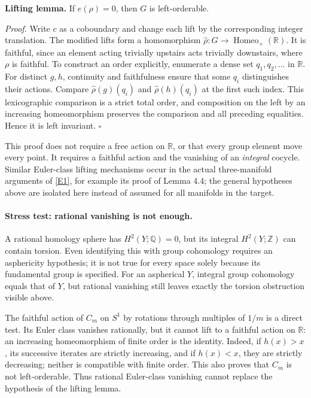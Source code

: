 \documentclass[11pt,a4paper]{article}
\newcommand{\Z}{\mathbb{Z}}
\newcommand{\Q}{\mathbb{Q}}
\newcommand{\R}{\mathbb{R}}
\newcommand{\eref}[2]{\hyperlink{extra:#1:#2}{[E#2]}}
\numberwithin{equation}{section}
\begin{document}
\textbf{Lifting lemma.} If $e(\rho)=0$, then $G$ is left-orderable.

\textit{Proof.} Write $c$ as a coboundary and change each lift by the
corresponding integer translation. The modified lifts form a homomorphism
$\widehat\rho:G\to\operatorname{Homeo}_+(\R)$. It is faithful, since an
element acting trivially upstairs acts trivially downstairs, where $\rho$
is faithful. To construct an order explicitly, enumerate a dense set
$q_1,q_2,\ldots$ in $\R$. For distinct $g,h$, continuity and faithfulness
ensure that some $q_i$ distinguishes their actions. Compare
$\widehat\rho(g)(q_i)$ and $\widehat\rho(h)(q_i)$ at the first such index.
This lexicographic comparison is a strict total order, and composition on
the left by an increasing homeomorphism preserves the comparison and all
preceding equalities. Hence it is left invariant. \hfill$\square$

This proof does not require a free action on $\R$, or that every group
element move every point. It requires a faithful action and the vanishing
of an \emph{integral} cocycle. Similar Euler-class lifting mechanisms
occur in the actual three-manifold arguments of \eref{statement}{1}, for example
its proof of Lemma 4.4; the general hypotheses above are isolated here
instead of assumed for all manifolds in the target.

\paragraph{Stress test: rational vanishing is not enough.}
A rational homology sphere has $H^2(Y;\Q)=0$, but its integral
$H^2(Y;\Z)$ can contain torsion. Even identifying this with group
cohomology requires an asphericity hypothesis; it is not true for every
space solely because its fundamental group is specified. For an
aspherical $Y$, integral group cohomology equals that of $Y$, but rational
vanishing still leaves exactly the torsion obstruction visible above.

The faithful action of $C_m$ on $S^1$ by rotations through multiples of
$1/m$ is a direct test. Its Euler class vanishes rationally, but it cannot
lift to a faithful action on $\R$: an increasing homeomorphism of finite
order is the identity. Indeed, if $h(x)>x$, its successive iterates are
strictly increasing, and if $h(x)<x$, they are strictly decreasing; neither
is compatible with finite order. This also proves that $C_m$ is not
left-orderable. Thus rational Euler-class vanishing cannot replace the
hypothesis of the lifting lemma.
\end{document}
